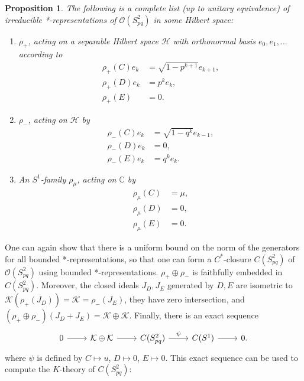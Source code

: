 \documentclass{book}
\newtheorem{proposition}[definition]{Proposition}
\begin{document}
\begin{proposition}
  The following is a complete list (up to unitary equivalence) of irreducible *-representations of \(\mathcal{O}(S^2_{pq})\) in some Hilbert space:
  \begin{enumerate}
    \item \(\rho_+\), acting on a separable Hilbert space \(\mathcal{H}\) with orthonormal basis \(e_0,e_1,\ldots\) according to
    \begin{align*}
      \rho_+(C)e_k&=\sqrt{1-p^{k+1}}e_{k+1},\\
      \rho_+(D)e_k&=p^k e_k,\\
      \rho_+(E)&=0.
    \end{align*}
    \item \(\rho_-\), acting on \(\mathcal{H}\) by
    \begin{align*}
      \rho_-(C)e_k&=\sqrt{1-q^{k}}e_{k-1},\\
      \rho_-(D)e_k&=0,\\
      \rho_-(E)e_k&=q^k e_k.  
    \end{align*}
    \item An \(S^1\)-family \(\rho_\mu\), acting on \(\mathbb{C}\) by
    \begin{align*}
      \rho_\mu(C)&=\mu,\\
      \rho_\mu(D)&=0,\\
      \rho_\mu(E)&=0.
    \end{align*}
  \end{enumerate}
\end{proposition}
One can again show that there is a uniform bound on the norm of the generators for all bounded *-representations, so that one can form a \(C^*\)-closure
\(C(S^2_{pq})\) of \(\mathcal{O}(S^2_{pq})\) using bounded *-representations.
\(\rho_+\oplus\rho_-\) is faithfully embedded in \(C(S^2_{pq})\). Moreover, the closed ideals \(J_D, J_E\)
generated by \(D, E\) are isometric to \(\mathcal{K}(\rho_+(J_D))=\mathcal{K}=\rho_-(J_E)\), they have zero intersection, and \((\rho_+\oplus\rho_-)(J_D+J_E)=\mathcal{K}\oplus\mathcal{K}\).
Finally, there is an exact sequence 
\begin{equation}\label{eq:8423}
  \begin{tikzcd}
    0\arrow[r]&\mathcal{K}\oplus \mathcal{K}\arrow[r]&C(S^2_{pq})\arrow[r,"\psi"]&C(S^1)\arrow[r]&0.
  \end{tikzcd}
\end{equation}
where \(\psi\) is defined by \(C\mapsto u\), \(D\mapsto 0\), \(E\mapsto 0\). This exact sequence can be used to compute the \(K\)-theory of \(C(S^2_{pq})\):
\end{document}
